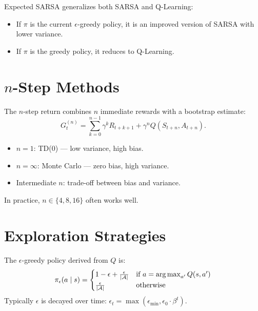 \begin{remark}
Expected SARSA generalizes both SARSA and Q-Learning:
\begin{itemize}
    \item If $\pi$ is the current $\epsilon$-greedy policy, it is an improved
    version of SARSA with lower variance.
    \item If $\pi$ is the greedy policy, it reduces to Q-Learning.
\end{itemize}
\end{remark}

\section{$n$-Step Methods}
\label{sec:nstep}

\begin{definition}
The $n$-step return combines $n$ immediate rewards with a bootstrap estimate:
\[
    G_t^{(n)} = \sum_{k=0}^{n-1} \gamma^k R_{t+k+1} + \gamma^n Q(S_{t+n}, A_{t+n}).
\]
\end{definition}

\begin{proposition}
\begin{itemize}
    \item $n=1$: TD(0) --- low variance, high bias.
    \item $n=\infty$: Monte Carlo --- zero bias, high variance.
    \item Intermediate $n$: trade-off between bias and variance.
\end{itemize}
In practice, $n \in \{4, 8, 16\}$ often works well.
\end{proposition}

\section{Exploration Strategies}
\label{sec:exploration}

\begin{definition}
The $\epsilon$-greedy policy derived from $Q$ is:
\[
    \pi_\epsilon(a \mid s) = \begin{cases}
        1 - \epsilon + \frac{\epsilon}{\left| \mathcal{A} \right|} & \text{if } a = \operatorname*{arg\,max}_{a'} Q(s,a') \\
        \frac{\epsilon}{\left| \mathcal{A} \right|} & \text{otherwise}
    \end{cases}
\]
Typically $\epsilon$ is decayed over time: $\epsilon_t = \max(\epsilon_{\min}, \epsilon_0 \cdot \beta^t)$.
\end{definition}

